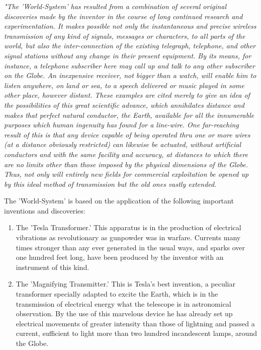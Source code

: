 \documentclass[a4paper,12pt,english,twoside,openright]{memoir}
\begin{document}
{
\itshape 
"The 'World-System' has resulted from a combination of several original 
discoveries made by the 
inventor in the course of long continued research and experimentation.  It makes possible not 
only the instantaneous and precise wireless transmission of any kind of signals, messages or 
characters, to all parts of the world, but also the inter-connection of the existing telegraph, 
telephone, and other signal stations without any change in their present equipment.  By its 
means, for instance, a telephone subscriber here may call up and talk to any other subscriber on 
the Globe.  An inexpensive receiver, not bigger than a watch, will enable him to listen anywhere, 
on land or sea, to a speech delivered or music played in some other place, however distant.  
These examples are cited merely to give an idea of the possibilities of this great scientific 
advance, which annihilates distance and makes that perfect natural conductor, the Earth, 
available for all the innumerable purposes which human ingenuity has found for a line-wire.  One 
far-reaching result of this is that any device capable of being operated thru one or more wires (at 
a distance obviously restricted) can likewise be actuated, without artificial conductors and with the 
same facility and accuracy, at distances to which there are no limits other than those imposed by 
the physical dimensions of the Globe.  Thus, not only will entirely new fields for commercial 
exploitation be opened up by this ideal method of transmission but the old ones vastly extended.  

The 'World-System' is based on the application of the following important inventions and 
discoveries: 
\begin{enumerate}[1.]
\item The 'Tesla Transformer.' This apparatus is in the production of electrical vibrations as 
revolutionary as gunpowder was in warfare.  Currents many times stronger than any ever 
generated in the usual ways, and sparks over one hundred feet long, have been produced by the 
inventor with an instrument of this kind.
\item The 'Magnifying Transmitter.' This is Tesla's best invention, a peculiar transformer specially 
adapted to excite the Earth, which is in the transmission of electrical energy what the telescope is 
in astronomical observation.  By the use of this marvelous device he has already set up electrical 
movements of greater intensity than those of lightning and passed a current, sufficient to light 
more than two hundred incandescent lamps, around the Globe.


\end{enumerate}}
\end{document}

